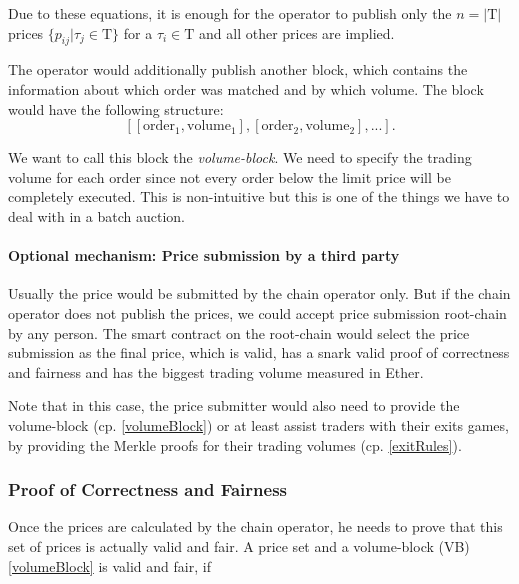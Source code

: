 \documentclass[11pt,parskip=full]{scrartcl}%
\newcommand{\Tau}{\mathrm{T}}
\begin{document}
Due to these equations, it is enough for the operator to publish only the $n=|\Tau|$ prices $\{p_{ij}| \tau_j \in \Tau \}$ for a $ \tau_i \in \Tau$ and all other prices are implied. 

The operator would additionally publish another block, which contains the information about which order was matched and by which volume. 
The block would have the following structure:
\[[[\text{order}_1, \text{volume}_1], [\text{order}_2, \text{volume}_2],...].\]

We want to call this block the \emph{volume-block}\label{volumeBlock}. 
We need to specify the trading volume for each order since not every order below the limit price will be completely executed. 
This is non-intuitive but this is one of the things we have to deal with in a batch auction. 

\paragraph{Optional mechanism: Price submission by a third party}
\label{publicPrices}
Usually the price would be submitted by the chain operator only. 
But if the chain operator does not publish the prices, we could accept price submission root-chain by any person. 
The smart contract on the root-chain would select the price submission as the final price, which is valid, has a snark valid proof of correctness and fairness and has the biggest trading volume measured in Ether. 

Note that in this case, the price submitter would also need to provide the volume-block (cp. \ref{volumeBlock}) or at least assist traders with their exits games, by providing the Merkle proofs for their trading volumes (cp. \ref{exitRules}). 

\subsubsection{Proof of Correctness and Fairness}
\label{proofprices}
Once the prices are calculated by the chain operator, he needs to prove that this set of prices is actually valid and fair. A price set and a volume-block (VB) \ref{volumeBlock} is valid and fair, if
\end{document}
